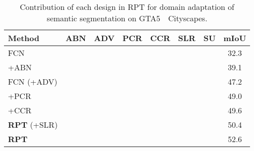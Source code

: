 \documentclass[10pt,twocolumn,letterpaper]{article}
\begin{document}
\begin{table}
      \centering
      \small
      \caption{\small Contribution of each design in RPT for domain adaptation of semantic segmentation on GTA5~~Cityscapes.}
      \begin{tabular}{l|c@{~}c@{~}c@{~}c@{~}c@{~}c|c} \hline
         \textbf{Method} & \textbf{ABN} & \textbf{ADV} & \textbf{PCR} & \textbf{CCR}  & \textbf{SLR} & \textbf{SU} & \textbf{mIoU} \\\hline
         FCN           &              &              &               &               &          &     & 32.3          \\
         +ABN         &       &              &               &               &          &    & 39.1           \\
         FCN (+ADV)        &       &       &               &               &          &    &  47.2          \\ \hline
         +{PCR}         &       &       &        &               &          &    & 49.0          \\
         +{CCR}        &       &       &        &        &          &     & 49.6          \\
         \textbf{RPT} (+{SLR})         &       &       &        &        &   &    &  50.4          \\
         \textbf{RPT}           &       &       &        &        &   &   &   52.6          \\\hline
      \end{tabular}
      \label{tab:contribution}
   \vspace{-0.15in}
\end{table}
\end{document}

